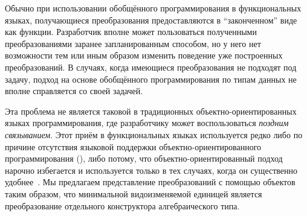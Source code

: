 Обычно при использовании обобщённого программирования в функциональных языках, получающиеся преобразования предоставляются в ``законченном'' виде как функции. 
Разработчик вполне может пользоваться полученными преобразованиями заранее запланированным способом, но у него нет возможности тем или иным образом изменить поведение уже построенных преобразований. В случаях, когда имеющиеся преобразования не подходят под задачу, подход на основе обобщённого программирования по типам данных не вполне справляется со своей задачей.



\begin{comment}
В некоторых случаях этого подхода не достаточно, и
если разработчика не вполне устраивает порождённое преобразование, %
то он может действовать двумя способами. Во-первых, он может реализовать новый вид преобразования для своих нужд.

В этом случае у разработчика могут возникнуть трудности, так как создание новых преобразований требует специфической экспертизы,
мало применимой при повседневной разработке программного обеспечения. Другим способом решения проблемы является реализация необходимого преобразования вручную без использования подхода обобщённого программирования. В этом случае увеличится размер кодовой базы и усложнится поддержка программного продукта в долгосрочной перспективе. 
\end{comment}

Эта проблема не является таковой в традиционных объектно-ориентированных языках программирования, где разработчику может воспользоваться \emph{поздним связыванием}. 
Этот приём в функциональных языках 
используется редко либо по причине отсутствия языковой поддержки объектно-ориентированного программирования (\haskell{}), либо потому, что объектно-ориентированный подход нарочно избегается и используется только в тех случаях, когда он существенно удобнее~\cite{modules-vs-objects}.
Мы предлагаем представление преобразований с помощью объектов таким образом, что минимальной видоизменяемой единицей является преобразование отдельного конструктора алгебраического типа.

